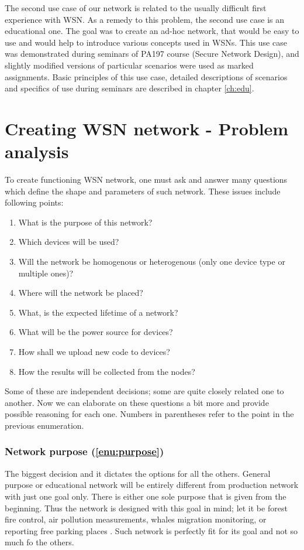 \documentclass[
  print, %
  Table,   %
  nolof,     %
  nolot,     %
           oneside
]{fithesis3}
\begin{document}
The second use case of our network is related to the usually difficult first experience with WSN. As a remedy to this problem, the second use case is an educational one. The goal was to create an ad-hoc network, that would be easy to use and would help to introduce various concepts used in WSNs. This use case was demonstrated during seminars of PA197 course (Secure Network Design), and slightly modified versions of particular scenarios were used as marked assignments. Basic principles of this use case, detailed descriptions of scenarios and specifics of use during seminars are described in chapter \ref{ch:edu}.

\chapter{Creating WSN network - Problem analysis}\label{ch:analysis}
  To create functioning WSN network, one must ask and answer many questions which define the shape and parameters of such network. These issues include following points:

  \begin{enumerate}

    \item \label{enu:purpose}What is the purpose of this network?
    \item \label{enu:devices}Which devices will be used?
    \item \label{enu:type}Will the network be homogenous or heterogenous (only one device type or multiple ones)?
    \item \label{enu:place}Where will the network be placed?
    \item \label{enu:life}What, is the expected lifetime of a network?
    \item \label{enu:power}What will be the power source for devices?
    \item \label{enu:upload}How shall we upload new code to devices?
    \item \label{enu:data}How the results will be collected from the nodes?

  \end{enumerate}

  Some of these are independent decisions; some are quite closely related one to another. Now we can elaborate on these questions a bit more and provide possible reasoning for each one. Numbers in parentheses refer to the point in the previous enumeration.

  \subsection{Network purpose (\ref{enu:purpose})}
  The biggest decision and it dictates the options for all the others. General purpose or educational network will be entirely different from production network with just one goal only. There is either one sole purpose that is given from the beginning. Thus the network is designed with this goal in mind; let it be forest fire control, air pollution measurements, whales migration monitoring, or reporting free parking places \cite{sanchez2014smartsantander}. Such network is perfectly fit for its goal and not so much fo the others.
\end{document}
